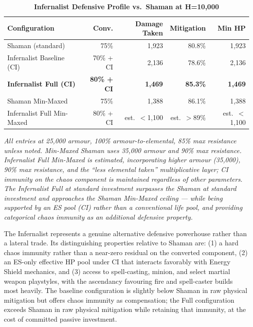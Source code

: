 \documentclass[12pt, letterpaper]{article}
\begin{document}
\begin{table}[htbp]
\centering
\caption{\textbf{Infernalist Defensive Profile vs.\ Shaman at H=10{,}000}}
\begin{tabular}{lrrrr}
\toprule
\textbf{Configuration} & \textbf{Conv.} & \textbf{Damage Taken} & \textbf{Mitigation} & \textbf{Min HP} \\
\midrule
\rowcolor{rowalt} Shaman (standard) & 75\% & 1{,}923 & 80.8\% & 1{,}923 \\
Infernalist Baseline (CI) & 70\% + CI & 2{,}136 & 78.6\% & 2{,}136 \\
\rowcolor{rowalt} \textbf{Infernalist Full (CI)} & \textbf{80\% + CI} & \textbf{1{,}469} & \textbf{85.3\%} & \textbf{1{,}469} \\
Shaman Min-Maxed & 75\% & 1{,}388 & 86.1\% & 1{,}388 \\
\rowcolor{rowhi} Infernalist Full Min-Maxed & 80\% + CI & est.\ $<$1{,}100 & est.\ $>$89\% & est.\ $<$1{,}100 \\
\bottomrule
\end{tabular}
\smallskip
\begin{minipage}{\linewidth}
\small\textit{All entries at 25{,}000 armour, 100\% armour-to-elemental, 85\% max resistance unless noted. Min-Maxed Shaman uses 35{,}000 armour and 90\% max resistance. Infernalist Full Min-Maxed is estimated, incorporating higher armour (35{,}000), 90\% max resistance, and the ``less elemental taken'' multiplicative layer; CI immunity on the chaos component is maintained regardless of other parameters. The Infernalist Full at standard investment surpasses the Shaman at standard investment and approaches the Shaman Min-Maxed ceiling --- while being supported by an ES pool (CI) rather than a conventional life pool, and providing categorical chaos immunity as an additional defensive property.}
\end{minipage}
\end{table}

The Infernalist represents a genuine alternative defensive powerhouse rather than a lateral trade. Its distinguishing properties relative to Shaman are: (1) a hard chaos immunity rather than a near-zero residual on the converted component, (2) an ES-only effective HP pool under CI that interacts favorably with Energy Shield mechanics, and (3) access to spell-casting, minion, and select martial weapon playstyles, with the ascendancy favouring fire and spell-caster builds most heavily. The baseline configuration is slightly below Shaman in raw physical mitigation but offers chaos immunity as compensation; the Full configuration exceeds Shaman in raw physical mitigation while retaining that immunity, at the cost of committed passive investment.
\end{document}
